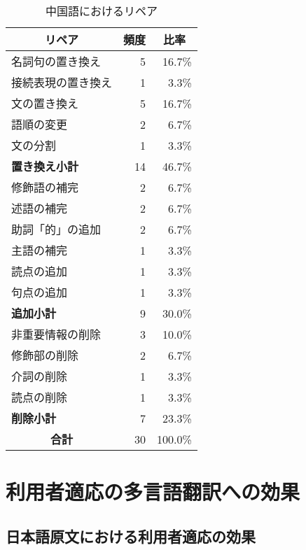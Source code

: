\begin{table}[htbp]
    \leavevmode
\small
    \caption{中国語におけるリペア}
    \label{Table:Repairs_in_Chinese}
    \vspace*{-3mm}
\begin {center}
\begin{tabular}{|l|r|r|}
\hline
\multicolumn{1}{|c|}{\bf リペア} & 
\multicolumn{1}{c|}{\bf 頻度} & 
\multicolumn{1}{c|}{\bf 比率}  \\
\hline 
名詞句の置き換え   &  5 &  16.7\% \\
接続表現の置き換え &  1 &   3.3\% \\
\hline
文の置き換え       &  5 &  16.7\% \\
語順の変更         &  2 &   6.7\% \\
文の分割           &  1 &   3.3\% \\
\hline 
{\bf 置き換え小計} & 14 &  46.7\% \\
\hline \hline
修飾語の補完       &  2 &   6.7\% \\
述語の補完         &  2 &   6.7\% \\
助詞「的」の追加   &  2 &   6.7\% \\
主語の補完         &  1 &   3.3\% \\
読点の追加         &  1 &   3.3\% \\
句点の追加         &  1 &   3.3\% \\
\hline 
{\bf 追加小計}     &  9 &  30.0\% \\
\hline \hline
非重要情報の削除   &  3 &  10.0\% \\
修飾部の削除       &  2 &   6.7\% \\
介詞の削除         &  1 &   3.3\% \\
読点の削除         &  1 &   3.3\% \\
\hline 
{\bf 削除小計}     &  7 &  23.3\% \\
\hline \hline
\multicolumn{1}{|c|}{\bf 合計} & 30 & 100.0\% \\
\hline
\end{tabular}
\end{center}
\end{table}

\section{利用者適応の多言語翻訳への効果}
\label{sec:Effect}

\subsection{日本語原文における利用者適応の効果}

